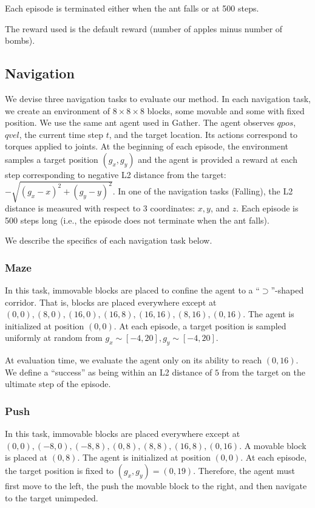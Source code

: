 \documentclass{article}
\begin{document}
Each episode is terminated either when the ant falls or at 500 steps.

The reward used is the default reward (number of apples minus number of bombs).

\subsection{Navigation}
We devise three navigation tasks to evaluate our method.
In each navigation task, we create an environment of
$8\times8\times8$ blocks, some movable and some with fixed position.    
We use the same ant agent used in Gather.
The agent observes $qpos$, $qvel$, the current time step $t$, and the target location.  Its actions correspond to torques applied to joints.  At the beginning of each episode, the environment samples a target position $(g_x, g_y)$ and the agent is provided a reward at each step corresponding to negative L2 distance from the target: $-\sqrt{(g_x - x)^2 + (g_y - y)^2}$.  In one of the navigation tasks (Falling), the L2 distance is measured with respect to 3 coordinates: $x, y$, and $z$.  Each episode is 500 steps long (i.e., the episode does not terminate when the ant falls).

We describe the specifics of each navigation task below.

\subsubsection{Maze}
In this task, immovable blocks are placed to confine the agent to a ``$\supset$''-shaped corridor.  That is, blocks are placed everywhere except at $(0,0), (8,0), (16,0), (16,8), (16,16), (8,16), (0,16)$.  The agent is initialized at position $(0,0)$.  At each episode, a target position is sampled uniformly at random from $g_x\sim[-4, 20],g_y\sim[-4,20]$.

At evaluation time, we evaluate the agent only on its ability to reach $(0, 16)$.  We define a ``success'' as being within an L2 distance of $5$ from the target on the ultimate step of the episode.

\subsubsection{Push}
In this task, immovable blocks are placed everywhere except at $(0,0), (-8,0), (-8,8), (0,8), (8,8), (16,8), (0,16)$.  A movable block is placed at $(0, 8)$.  The agent is initialized at position $(0,0)$.  At each episode, the target position is fixed to $(g_x, g_y) = (0, 19)$.  Therefore, the agent must first move to the left, the push the movable block to the right, and then navigate to the target unimpeded.
\end{document}
